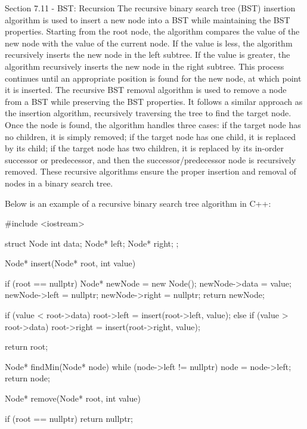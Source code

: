 \begin{notes}{Section 7.11 - BST: Recursion}
    The recursive binary search tree (BST) insertion algorithm is used to insert a new node into a BST while maintaining the BST properties. Starting from the root node, the algorithm compares the value of the new node with the value of the current node. If the value is less, the algorithm recursively inserts the new node in the left subtree. 
    If the value is greater, the algorithm recursively inserts the new node in the right subtree. This process continues until an appropriate position is found for the new node, at which point it is inserted. The recursive BST removal algorithm is used to remove a node from a BST while preserving the BST properties. It follows a similar approach 
    as the insertion algorithm, recursively traversing the tree to find the target node. Once the node is found, the algorithm handles three cases: if the target node has no children, it is simply removed; if the target node has one child, it is replaced by its child; if the target node has two children, it is replaced by its in-order successor 
    or predecessor, and then the successor/predecessor node is recursively removed. These recursive algorithms ensure the proper insertion and removal of nodes in a binary search tree.
    
    \begin{highlight}
        Below is an example of a recursive binary search tree algorithm in C++:
    
    \begin{code}[C++]
    #include <iostream>
    
    struct Node {
        int data;
        Node* left;
        Node* right;
    };
    
    Node* insert(Node* root, int value) {
        if (root == nullptr) {
            Node* newNode = new Node();
            newNode->data = value;
            newNode->left = nullptr;
            newNode->right = nullptr;
            return newNode;
        }
    
        if (value < root->data) {
            root->left = insert(root->left, value);
        } else if (value > root->data) {
            root->right = insert(root->right, value);
        }
    
        return root;
    }
    
    Node* findMin(Node* node) {
        while (node->left != nullptr) {
            node = node->left;
        }
        return node;
    }
    
    Node* remove(Node* root, int value) {
        if (root == nullptr) {
            return nullptr;
        }
    
}
\end{code}
\end{highlight}
\end{notes}
